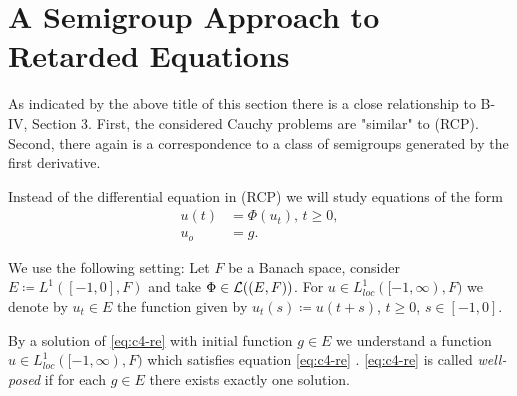 
\section{A Semigroup Approach to Retarded Equations}\label{c4-3}

%

As indicated by the above title of this section there is a close relationship to B-IV, Section 3.
First, the considered Cauchy problems are "similar" to (RCP).
Second, there again is a correspondence to a class of semigroups generated by the first derivative.

Instead of the differential equation in (RCP) we will study equations of the form
\begin{equation*}\label{eq:c4-re} \tag{RE}
\begin{split} 
u(t) &= \Phi(u_t), \, t \geq 0,\\
u_o &= g.
\end{split}
\end{equation*}


We use the following setting: Let $F$ be a Banach space, consider $E \coloneqq L^{1}([-1,0],F)$ and take $\Phi \in \mathcal{L}((E,F))$.
For $u \in L^{1}_{loc}([-1,\infty),F)$ we denote by $u_t \in E$ the function given by $u_t(s) \coloneqq u(t+s)$, $t \geq 0$, $s \in [-1,0]$.

By a solution of \eqref{eq:c4-re} with initial function $g \in E$ we understand a function $u \in L^{1}_{loc}([-1,\infty),F)$ which satisfies equation \eqref{eq:c4-re} .
\eqref{eq:c4-re} is called \emph{well-posed} if for each $g \in E$ there exists exactly one solution.

